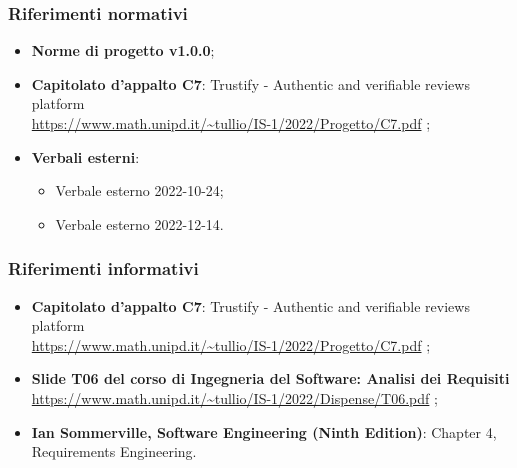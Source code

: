 \subsubsection{Riferimenti normativi}
\begin{itemize}
    \item \textbf{Norme di progetto v1.0.0};
    \item \textbf{Capitolato d'appalto C7}: Trustify - Authentic and verifiable reviews platform \\
          \url{https://www.math.unipd.it/~tullio/IS-1/2022/Progetto/C7.pdf}
          \hfill{};
    \item \textbf{Verbali esterni}:
          \begin{itemize}
              \item Verbale esterno 2022-10-24;
              \item Verbale esterno 2022-12-14.
          \end{itemize}
\end{itemize}
\subsubsection{Riferimenti informativi}
\begin{itemize}
    \item \textbf{Capitolato d'appalto C7}: Trustify - Authentic and verifiable reviews platform \\
          \url{https://www.math.unipd.it/~tullio/IS-1/2022/Progetto/C7.pdf}
          \hfill{};
    \item \textbf{Slide T06 del corso di Ingegneria del Software: Analisi dei Requisiti} \\
          \url{https://www.math.unipd.it/~tullio/IS-1/2022/Dispense/T06.pdf}
          \hfill{};
    \item \textbf{Ian Sommerville, Software Engineering (Ninth Edition)}: Chapter 4, Requirements Engineering.
\end{itemize}